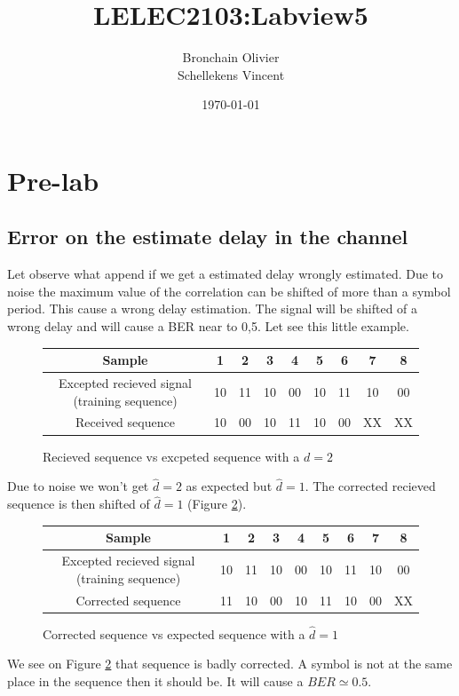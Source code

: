 \documentclass{article}
\title{LELEC2103:Labview5}
\author{Bronchain Olivier \\ Schellekens Vincent}
\date{\today}
\begin{document}
\maketitle
\section{Pre-lab}
	\subsection{Error on the estimate delay in the channel}
		Let observe what append if we get a estimated delay wrongly estimated. Due to noise the maximum value of the correlation can be shifted of more than a symbol period. This cause a wrong delay estimation. The signal will be shifted of a wrong delay and will cause a BER near to 0,5. Let see this little example. \\ 
		\begin{figure}[h!]
			\centering
			\begin{tabular}{|c|| c | c | c | c | c | c | c | c |}
				\hline
				Sample & 1 & 2 & 3 & 4 & 5 & 6 & 7 & 8 \\ 
				\hline
				\hline 
				Excepted recieved signal (training sequence) & 10 & 11 & 10 & 00 & 10 & 11 & 10 & 00 \\
				\hline
				Received sequence & 10 & 00 & 10 & 11 & 10 & 00  & XX & XX \\
				\hline
			\end{tabular}
			\caption{Recieved sequence vs excpeted sequence with a $d=2$ \label{f1}}	
		\end{figure}
	
		Due to noise we won't get $\hat{d}=2$ as expected but $\hat{d}=1$. The corrected recieved sequence is then shifted of $\hat{d}=1$ (Figure \ref{f2}). \\ 
		\begin{figure}[h!]
			\centering
			\begin{tabular}{|c||c|c|c|c|c|c|c|c|}
				\hline
				Sample & 1 & 2 & 3 & 4 & 5 & 6 & 7 & 8 \\
				\hline
				\hline 
				Excepted recieved signal (training sequence) & 10 & 11 & 10 & 00 & 10 & 11 & 10 & 00 \\
				\hline
				Corrected sequence & 11 & 10 & 00 & 10 & 11 & 10 & 00 & XX \\
				\hline		
			\end{tabular}
			\caption{Corrected sequence vs expected sequence with a $\hat{d}=1$ \label{f2}}
		\end{figure}
		We see on Figure \ref{f2} that sequence is badly corrected. A symbol is not at the same place in the sequence then it should be. It will cause a $BER \simeq 0.5$. 
\end{document}
